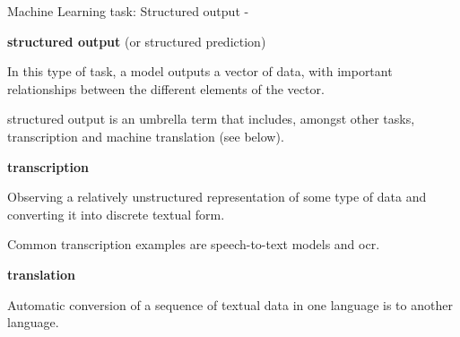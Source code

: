 
\begin{frame}[t,allowframebreaks]{
    Machine Learning task: Structured output - }


    {\bf {}\Gls{structured output}} 
    (or \gls{structured prediction})\\
    \vspace{0.1cm}
    \begin{itemize}
        {
            \item
            In this type of task, a model outputs
            a vector of data, with important relationships between 
            the different elements of the vector.\\
            \vspace{0.1cm}
            \item 
            \Gls{structured output} is an umbrella term that includes,
            amongst other tasks, 
            \gls{transcription} 
            and machine \gls{translation} (see below).                 
        }
    \end{itemize}

    {\bf {}\Gls{transcription}} \\
    \vspace{0.1cm}
    \begin{itemize}
        {
            \item
            Observing a relatively unstructured 
            representation of some type of data and converting it into
            discrete textual form.\\
            \vspace{0.1cm}
            \item 
            Common \gls{transcription} examples are 
            \Gls{speech-to-text} models
            and \gls{ocr}.
        }
    \end{itemize}

    {\bf {}\Gls{translation}} \\
    \vspace{0.1cm}
    \begin{itemize}
        {
            \item
            Automatic conversion of a sequence of textual data in one 
            language is to another language.\\
        }
    \end{itemize}

\end{frame}